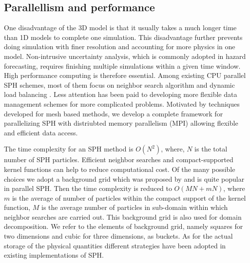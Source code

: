 \documentclass[gmd, manuscript]{copernicus}
\begin{document}
\subsection{Parallellism and performance}
One disadvantage of the 3D model is that it usually takes a much longer time than 1D models to complete one simulation. This disadvantage further prevents doing simulation with finer resolution and accounting for more physics in one model. Non-intrusive uncertainty analysis, which is commonly adopted in hazard forecasting, requires finishing multiple simulations within a given time window. High performance computing is therefore essential. Among existing CPU parallel SPH schemes, most of them focus on neighbor search algorithm and dynamic load balancing \citep {ferrari2009new, crespo2015dualsphysics}. Less attention has been paid to developing more flexible data management schemes for more complicated problems. Motivated by techniques developed for mesh based methods, we develop a complete framework for parallelizing SPH with distriubted memory parallelism (MPI) allowing flexible and efficient data access.

The time complexity for an SPH method is $O(N^2)$, where, $N$ is the total number of SPH particles. Efficient neighbor searches and compact-supported kernel functions can help to reduce computational cost. Of the many possible choices we adopt a background grid  which was proposed by \citet {monaghan1985refined} and is quite popular in parallel SPH. Then the time complexity is reduced to $O(MN+mN)$, where $m$ is the average of number of particles within the compact support of the kernel function, $M$ is the average number of particles in sub-domain within which neighbor searches are carried out. This background grid is also used for domain decomposition. We refer to the elements of background grid, namely squares for two dimensions and cubic for three dimensions, as buckets. 
As for the actual storage of the physical quantities  different strategies have been adopted in existing implementations of SPH.
\end{document}
